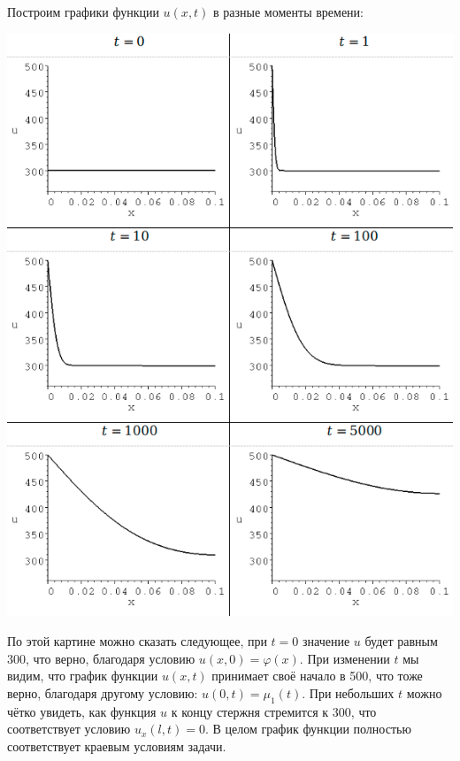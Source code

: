 Построим графики функции $u(x, t)$ в разные моменты времени:

\includegraphics[width=0.8\linewidth]{task1.png}

По этой картине можно сказать следующее, при $t = 0$ значение $u$ будет равным 300, что верно, благодаря условию $u(x, 0) = \varphi(x)$. При изменении $t$ мы видим, что график функции $u(x, t)$ принимает своё начало в 500, что тоже верно, благодаря другому условию: $u(0, t) = \mu_{1}(t)$. При небольших $t$ можно чётко увидеть, как функция $u$ к концу стержня стремится к 300, что соответствует условию $u_{x}(l, t) = 0$. В целом график функции полностью соответствует краевым условиям задачи.

\pagebreak